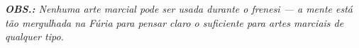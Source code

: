 
\begin{multicols}{2}






\textit{{\bf OBS.: } Nenhuma arte marcial pode ser usada durante o frenesi — a mente está tão mergulhada na Fúria para pensar claro o suficiente para artes marciais de qualquer tipo.}


%
%







%
\end{multicols}




